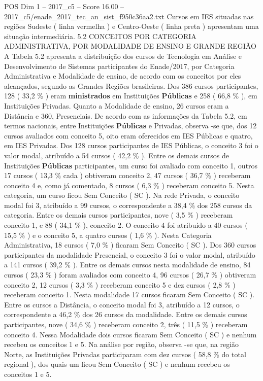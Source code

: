 \begin{textsample}{POS Dim 1 – 2017\_c5 – Score 16.00 – 2017\_c5/enade\_2017\_tec\_an\_sist\_f950c36aa2.txt}
Cursos em IES situadas nas regiões Sudeste ( linha vermelha ) e Centro-Oeste ( linha preta ) apresentam uma situação intermediária. 5.2 CONCEITOS POR CATEGORIA ADMINISTRATIVA, POR MODALIDADE DE ENSINO E GRANDE REGIÃO A Tabela 5.2 apresenta a distribuição dos cursos de Tecnologia em Análise e Desenvolvimento de Sistemas participantes do Enade/2017, por Categoria Administrativa e Modalidade de ensino, de acordo com os conceitos por eles alcançados, segundo as Grandes Regiões brasileiras.
Dos 386 cursos participantes, 128 ( 33,2 \% ) eram \textbf{ministrados} em Instituições \textbf{Públicas} e 258 ( 66,8 \% ), em Instituições Privadas.
Quanto a Modalidade de ensino, 26 cursos eram a Distância e 360, Presenciais.
De acordo com as informações da Tabela 5.2, em termos nacionais, entre Instituições \textbf{Públicas} e Privadas, observa -se que, dos 12 cursos avaliados com conceito 5, oito eram oferecidos em IES Públicas e quatro, em IES Privadas.
Dos 128 cursos participantes de IES Públicas, o conceito 3 foi o valor modal, atribuído a 54 cursos ( 42,2 \% ).
Entre os demais cursos de Instituições \textbf{Públicas} participantes, um curso foi avaliado com conceito 1, outros 17 cursos ( 13,3 \% cada ) obtiveram conceito 2, 47 cursos ( 36,7 \% ) receberam conceito 4 e, como já comentado, 8 cursos ( 6,3 \% ) receberam conceito 5.
Nesta categoria, um curso ficou Sem Conceito ( SC ).
Na rede Privada, o conceito modal foi 3, atribuído a 99 cursos, o correspondente a 38,4 \% dos 258 cursos da categoria.
Entre os demais cursos participantes, nove ( 3,5 \% ) receberam conceito 1, e 88 ( 34,1 \% ), conceito 2.
O conceito 4 foi atribuído a 40 cursos ( 15,5 \% ) e o conceito 5, a quatro cursos ( 1,6 \% ).
Nesta Categoria Administrativa, 18 cursos ( 7,0 \% ) ficaram Sem Conceito ( SC ).
Dos 360 cursos participantes da modalidade Presencial, o conceito 3 foi o valor modal, atribuído a 141 cursos ( 39,2 \% ).
Entre os demais cursos nesta modalidade de ensino, 84 cursos ( 23,3 \% ) foram avaliados com conceito 4, 96 cursos ( 26,7 \% ) obtiveram conceito 2, 12 cursos ( 3,3 \% ) receberam conceito 5 e dez cursos ( 2,8 \% ) receberam conceito 1.
Nesta modalidade 17 cursos ficaram Sem Conceito ( SC ).
Entre os cursos a Distância, o conceito modal foi 3, atribuído a 12 cursos, o correspondente a 46,2 \% dos 26 cursos da modalidade.
Entre os demais cursos participantes, nove ( 34,6 \% ) receberam conceito 2, três ( 11,5 \% ) receberam conceito 4.
Nessa Modalidade dois cursos ficaram Sem Conceito ( SC ) e nenhum recebeu os conceitos 1 e 5.
Na análise por região, observa -se que, na região Norte, as Instituições Privadas participaram com dez cursos ( 58,8 \% do total regional ), dos quais um ficou Sem Conceito ( SC ) e nenhum recebeu os conceitos 1 e 5.

\end{textsample}
